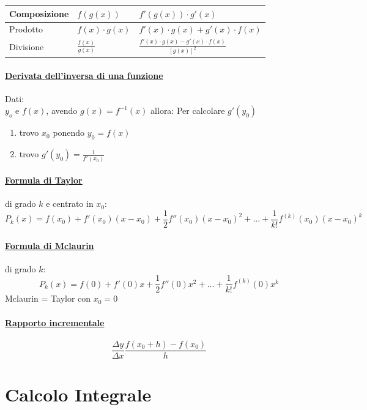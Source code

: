 \documentclass[12pt, a4paper]{article}
\begin{document}
	\begin{tabularx}{\textwidth}{|l|Y|Y|}
		\hline
		Composizione & $f(g(x))$           & $ f'(g(x))\cdot g'(x)$                                \\
		\hline
		Prodotto     & $f(x)\cdot g(x)$    & $f'(x)\cdot g(x) + g'(x)\cdot f(x)$                   \\
		\hline
		Divisione    & $\frac{f(x)}{g(x)}$ & $\frac{f'(x)\cdot g(x) - g'(x) \cdot f(x)}{[g(x)]^2}$ \\
		\hline
	\end{tabularx}

	\paragraph*{\underline{Derivata dell'inversa di una funzione}}
	Dati:\\
$y_o$ e $f(x)$, avendo $g(x) = f^{-1}(x)$ allora:
	Per calcolare $g'(y_0)$
	\begin{enumerate}
		\item trovo $x_0$ ponendo $y_0=f(x)$
		\item trovo $g'(y_0)=\frac{1}{f'(x_0)}$
	\end{enumerate}

	\paragraph*{\underline{Formula di Taylor}} di grado $k$ e centrato in $x_0$:
	$$P_k(x)=f(x_0)+f'(x_0)(x-x_0) + \frac{1}{2}f''(x_0)(x-x_0)^2 +... + \frac{1}{k!}f^{(k)}(x_0)(x-x_0)^k$$

	\paragraph*{\underline{Formula di Mclaurin}} di grado $k$:
	$$P_k(x)=f(0)+f'(0)x+\frac{1}{2}f''(0)x^2+...+\frac{1}{k!}f^{(k)}(0)x^k$$
	\small{Mclaurin = Taylor con $x_0=0$}

	\paragraph*{\underline{Rapporto incrementale}}
	$$\frac{\Delta y}{ \Delta x}\frac{f(x_0+h)-f(x_0)}{h} $$


	\section*{Calcolo Integrale}
\end{document}
